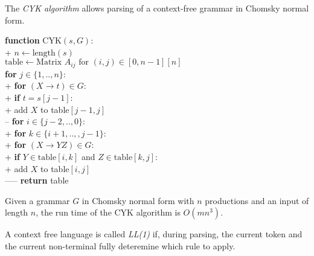 \documentclass{article}
\begin{document}
\begin{definition}
	The \emph{CYK algorithm} allows parsing of a context-free
	grammar in Chomsky normal form.
	\begin{pseudo}
		\textbf{function} \textsf{CYK}$(s,G)$:\\+
			$n\leftarrow\text{length}(s)$\\
			$\text{table}\leftarrow\text{Matrix }A_{ij}\text{ for }(i,j)\in[0,n-1][n]$\\
			\textbf{for} $j\in\{1,..,n\}$:\\+
				\textbf{for} $(X\to t)\in G$:\\+
					\textbf{if} $t=s[j-1]$:\\+
						add $X$ to table$[j-1,j]$\\--
				\textbf{for} $i\in\{j-2,..,0\}$:\\+
					\textbf{for} $k\in\{i+1,..,,j-1\}$:\\+
						\textbf{for} $(X\to YZ)\in G$:\\+
							\textbf{if} $Y\in\text{table}[i,k]$ and $Z\in\text{table}[k,j]$:\\+
								add $X$ to table$[i,j]$\\-----
            \textbf{return} table
    \end{pseudo}
\end{definition}

\begin{theorem}
	Given a grammar $G$ in Chomsky normal form with $n$ 
	productions and an input of length $n$, the run time
	of the CYK algorithm is $O(mn^3)$.
\end{theorem}

\begin{definition}[L22]
	A context free language is called \emph{LL(1)} if, during
	parsing, the current token and the current non-terminal fully
	deteremine which rule to apply.	
\end{definition}
\end{document}
